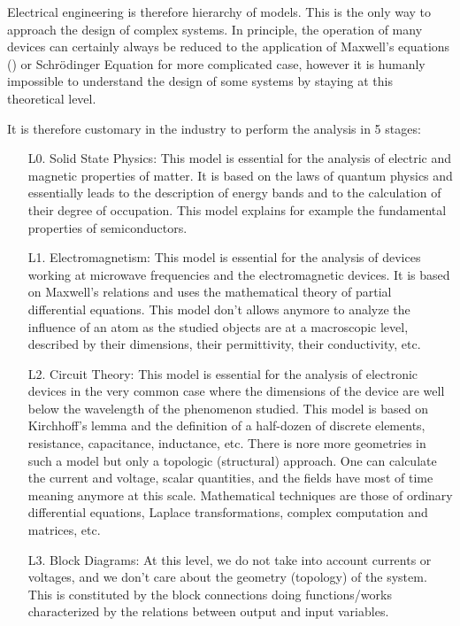 	Electrical engineering is therefore hierarchy of models. This is the only way to approach the design of complex systems. In principle, the operation of many devices can certainly always be reduced to the application of Maxwell's equations () or Schrödinger Equation for more complicated case, however it is humanly impossible to understand the design of some systems by staying at this theoretical level.
	
	It is therefore customary in the industry to perform the analysis in 5 stages:
	\begin{enumerate}
		\item[L0.] Solid State Physics: This model is essential for the analysis of electric and magnetic properties of matter. It is based on the laws of quantum physics and essentially leads to the description of energy bands and to the calculation of their degree of occupation. This model explains for example the fundamental properties of semiconductors.
		
		\item[L1.] Electromagnetism: This model is essential for the analysis of devices working at microwave frequencies and the electromagnetic devices. It is based on Maxwell's relations and uses the mathematical theory of partial differential equations. This model don't allows anymore to analyze the influence of an atom as the studied objects are at a macroscopic level, described by their dimensions, their permittivity, their conductivity, etc.
		
		\item[L2.] Circuit Theory: This model is essential for the analysis of electronic devices in the very common case where the dimensions of the device are well below the wavelength of the phenomenon studied. This model is based on Kirchhoff's lemma and the definition of a half-dozen of discrete elements, resistance, capacitance, inductance, etc. There is nore more geometries  in such a model but only a topologic (structural) approach. One can calculate the current and voltage, scalar quantities, and the fields have most of time meaning anymore at this scale. Mathematical techniques are those of ordinary differential equations, Laplace transformations, complex computation and matrices, etc.
		
		\item[L3.] Block Diagrams: At this level, we do not take into account currents or voltages, and we don't care about the geometry (topology) of the system. This is constituted by the block connections doing functions/works characterized by the relations between output and input variables.
		

\end{enumerate}
